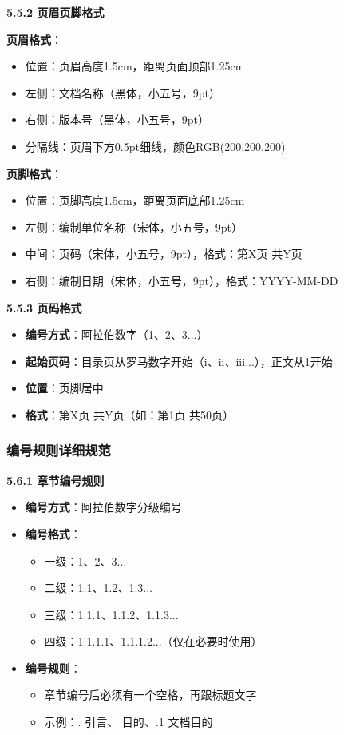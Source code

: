 \documentclass[12pt,a4paper]{article}
\numberwithin{equation}{section}  %
\begin{document}
\textbf{5.5.2 页眉页脚格式}

\textbf{页眉格式}：
\begin{itemize}
\item 位置：页眉高度1.5cm，距离页面顶部1.25cm
\item 左侧：文档名称（黑体，小五号，9pt）
\item 右侧：版本号（黑体，小五号，9pt）
\item 分隔线：页眉下方0.5pt细线，颜色RGB(200,200,200)
\end{itemize}

\textbf{页脚格式}：
\begin{itemize}
\item 位置：页脚高度1.5cm，距离页面底部1.25cm
\item 左侧：编制单位名称（宋体，小五号，9pt）
\item 中间：页码（宋体，小五号，9pt），格式：第X页 共Y页
\item 右侧：编制日期（宋体，小五号，9pt），格式：YYYY-MM-DD
\end{itemize}

\textbf{5.5.3 页码格式}

\begin{itemize}
\item \textbf{编号方式}：阿拉伯数字（1、2、3...）
\item \textbf{起始页码}：目录页从罗马数字开始（i、ii、iii...），正文从1开始
\item \textbf{位置}：页脚居中
\item \textbf{格式}：第X页 共Y页（如：第1页 共50页）
\end{itemize}

\subsubsection{编号规则详细规范}
\textbf{5.6.1 章节编号规则}

\begin{itemize}
\item \textbf{编号方式}：阿拉伯数字分级编号
\item \textbf{编号格式}：
\begin{itemize}
\item 一级：1、2、3...
\item 二级：1.1、1.2、1.3...
\item 三级：1.1.1、1.1.2、1.1.3...
\item 四级：1.1.1.1、1.1.1.2...（仅在必要时使用）

\end{itemize}
\item \textbf{编号规则}：
\begin{itemize}
\item 章节编号后必须有一个空格，再跟标题文字
\item 示例：{. 引言}、{ 目的}、{.1 文档目的}
\end{itemize}
\end{itemize}
\end{document}
